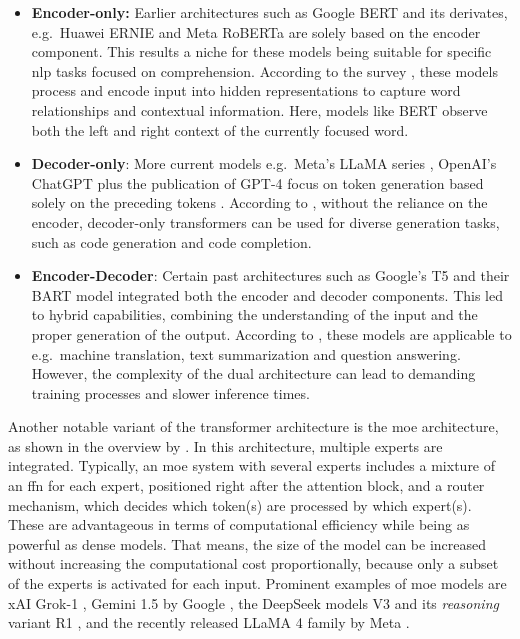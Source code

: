 \begin{itemize}
   \item \textbf{Encoder-only:} Earlier architectures such as Google BERT \cite{devlin_bert_2019} and its derivates, e.g.\ Huawei ERNIE \cite{zhang_ernie_2019} and Meta RoBERTa \cite{liu_roberta_2019} are solely based on the encoder component. This results a niche for these models being suitable for specific \ac{nlp} tasks focused on comprehension. According to the survey \cite{hou_large_2024}, these models process and encode input into hidden representations to capture word relationships and contextual information. Here, models like BERT observe both the left and right context of the currently focused word.
   
   \item \textbf{Decoder-only}: More current models e.g.\ Meta's LLaMA series \cite{touvron_llama_2023}, OpenAI's ChatGPT \cite{openai_introducing_2022} plus the publication of GPT-4 \cite{openai_gpt-4_2024} focus on token generation based solely on the preceding tokens \cite{shao_survey_2024}. According to \cite{hou_large_2024}, without the reliance on the encoder, decoder-only transformers can be used for diverse generation tasks, such as code generation and code completion.

   \item \textbf{Encoder-Decoder}: Certain past architectures such as Google's T5 \cite{raffel_exploring_2023} and their BART model \cite{lewis_bart_2019} integrated both the encoder and decoder components. This led to hybrid capabilities, combining the understanding of the input and the proper generation of the output. According to \cite{wang_history_2024}, these models are applicable to e.g.\ machine translation, text summarization and question answering. However, the complexity of the dual architecture can lead to demanding training processes and slower inference times.
\end{itemize}

 Another notable variant of the transformer architecture is the \ac{moe} \cite{shazeer_outrageously_2017} architecture, as shown in the overview by \cite{naveed_comprehensive_2024}. In this architecture, multiple experts are integrated. Typically, an \ac{moe} system with several experts includes a mixture of an \ac{ffn} for each expert, positioned right after the attention block, and a router mechanism, which decides which token(s) are processed by which expert(s). These are advantageous in terms of computational efficiency while being as powerful as dense models. That means, the size of the model can be increased without increasing the computational cost proportionally, because only a subset of the experts is activated for each input.
Prominent examples of \ac{moe} models are xAI Grok-1 \cite{xai_open_2024}, Gemini 1.5 by Google \cite{team_gemini_2024-1}, the DeepSeek models V3 \cite{deepseek-ai_deepseek-v3_2025} and its \textit{reasoning} variant R1 \cite{deepseek-ai_deepseek-r1_2025}, and the recently released LLaMA 4 family by Meta \cite{meta_ai_llama_2025}.

